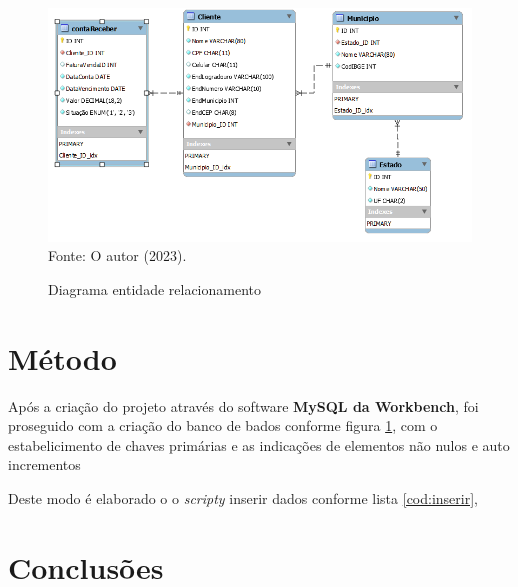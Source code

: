 \begin{figure}[h!]
  \caption{Diagrama entidade relacionamento}
  \includegraphics[width=\textwidth]{figure/diagram_EER.png}
  \label{fig:DER}
  {\fontsize{10pt}{\baselineskip}\selectfont
  Fonte: O autor (2023).}
\end{figure}

\newpage

\section{Método}
\par Após a criação do projeto através do software \textbf{MySQL da Workbench}, foi proseguido com a criação do banco de bados conforme figura \ref{fig:DER}, com o estabelicimento de chaves primárias e as indicações de elementos não nulos e auto incrementos


\par Deste modo é elaborado o o \textit{scripty} inserir dados conforme lista \ref{cod:inserir},





\section{Conclusões}


